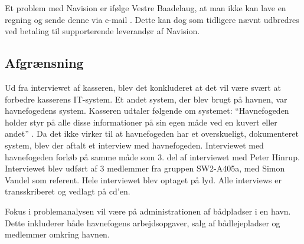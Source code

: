 Et problem med Navision er ifølge Vestre Baadelaug, at man ikke kan lave en regning og sende denne via e-mail \cite{int_vb_sl}. Dette kan dog som tidligere nævnt udbredres ved betaling til supporterende leverandør af Navision.

\subsection{Afgrænsning} %


Ud fra interviewet af kasseren, blev det konkluderet at det vil være svært at forbedre kasserens IT-system. Et andet system, der blev brugt på havnen, var havnefogedens system. Kasseren udtaler følgende om systemet: \enquote{Havnefogeden holder styr på alle disse informationer på sin egen måde ved en kuvert eller andet} \cite{int_vb_sl}. Da det ikke virker til at havnefogeden har et overskueligt, dokumenteret system, blev der aftalt et interview med havnefogeden. Interviewet med havnefogeden forløb på samme måde som 3. del af interviewet med Peter Hinrup. Interviewet blev udført af 3 medlemmer fra gruppen SW2-A405a, med Simon Vandel som referent. Hele interviewet blev optaget på lyd. Alle interviews er transskriberet og vedlagt på cd'en. 

Fokus i problemanalysen vil være på administrationen af bådpladser i en havn. Dette inkluderer både havnefogens arbejdsopgaver, salg af bådlejepladser og medlemmer omkring havnen.
